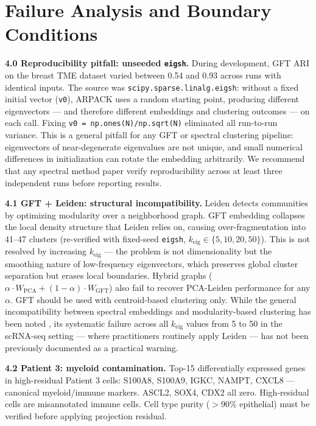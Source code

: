 \documentclass{article}
\begin{document}
\section{Failure Analysis and Boundary Conditions}
\label{sec:failure}

\textbf{4.0 Reproducibility pitfall: unseeded \texttt{eigsh}.} During development, GFT ARI on the breast TME dataset varied between 0.54 and 0.93 across runs with identical inputs. The source was \texttt{scipy.sparse.linalg.eigsh}: without a fixed initial vector (\texttt{v0}), ARPACK uses a random starting point, producing different eigenvectors --- and therefore different embeddings and clustering outcomes --- on each call. Fixing \texttt{v0 = np.ones(N)/np.sqrt(N)} eliminated all run-to-run variance. This is a general pitfall for any GFT or spectral clustering pipeline: eigenvectors of near-degenerate eigenvalues are not unique, and small numerical differences in initialization can rotate the embedding arbitrarily. We recommend that any spectral method paper verify reproducibility across at least three independent runs before reporting results.

\textbf{4.1 GFT + Leiden: structural incompatibility.} Leiden detects communities by optimizing modularity over a neighborhood graph. GFT embedding collapses the local density structure that Leiden relies on, causing over-fragmentation into 41--47 clusters (re-verified with fixed-seed \texttt{eigsh}, $k_\text{eig}\in\{5,10,20,50\}$). This is not resolved by increasing $k_\text{eig}$ --- the problem is not dimensionality but the smoothing nature of low-frequency eigenvectors, which preserves global cluster separation but erases local boundaries. Hybrid graphs ($\alpha \cdot W_\text{PCA} + (1-\alpha)\cdot W_\text{GFT}$) also fail to recover PCA-Leiden performance for any $\alpha$. GFT should be used with centroid-based clustering only. While the general incompatibility between spectral embeddings and modularity-based clustering has been noted \citep{luxburg2007}, its systematic failure across all $k_\text{eig}$ values from 5 to 50 in the scRNA-seq setting --- where practitioners routinely apply Leiden --- has not been previously documented as a practical warning.

\textbf{4.2 Patient 3: myeloid contamination.} Top-15 differentially expressed genes in high-residual Patient 3 cells: S100A8, S100A9, IGKC, NAMPT, CXCL8 --- canonical myeloid/immune markers. ASCL2, SOX4, CDX2 all zero. High-residual cells are misannotated immune cells. Cell type purity ($>90\%$ epithelial) must be verified before applying projection residual.
\end{document}
